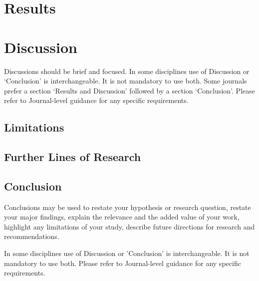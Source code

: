 \documentclass[sn-mathphys, Numbered]{sn-jnl}%
\theoremstyle{thmstyleone}%
\theoremstyle{thmstyletwo}%
\theoremstyle{thmstylethree}%
\begin{document}
\section{Results}\label{Results}

\section{Discussion}\label{Discussion}

Discussions should be brief and focused. In some disciplines use of Discussion or `Conclusion' is interchangeable. It is not mandatory to use both. Some journals prefer a section `Results and Discussion' followed by a section `Conclusion'. Please refer to Journal-level guidance for any specific requirements. 


\subsection{Limitations}\label{Limitations}

\subsection{Further Lines of Research}\label{Further Lines of Research}

\subsection{Conclusion}\label{Conclusion}

Conclusions may be used to restate your hypothesis or research question, restate your major findings, explain the relevance and the added value of your work, highlight any limitations of your study, describe future directions for research and recommendations. 

In some disciplines use of Discussion or 'Conclusion' is interchangeable. It is not mandatory to use both. Please refer to Journal-level guidance for any specific requirements. 


\printbibliography
\end{document}
